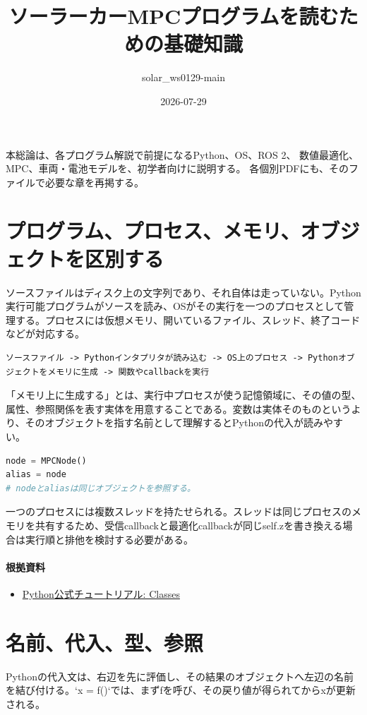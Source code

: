 \documentclass[a4paper,11pt]{article}
\title{ソーラーカーMPCプログラムを読むための基礎知識}
\author{solar\_ws0129-main}
\date{2026-07-29}
\begin{document}
                \maketitle
                \tableofcontents
                \clearpage

                本総論は、各プログラム解説で前提になるPython、OS、ROS 2、
                数値最適化、MPC、車両・電池モデルを、初学者向けに説明する。
                各個別PDFにも、そのファイルで必要な章を再掲する。

                \section{プログラム、プロセス、メモリ、オブジェクトを区別する}
ソースファイルはディスク上の文字列であり、それ自体は走っていない。Python実行可能プログラムがソースを読み、OSがその実行を一つのプロセスとして管理する。プロセスには仮想メモリ、開いているファイル、スレッド、終了コードなどが対応する。


\begin{lstlisting}
ソースファイル -> Pythonインタプリタが読み込む -> OS上のプロセス -> Pythonオブジェクトをメモリに生成 -> 関数やcallbackを実行
\end{lstlisting}


「メモリ上に生成する」とは、実行中プロセスが使う記憶領域に、その値の型、属性、参照関係を表す実体を用意することである。変数は実体そのものというより、そのオブジェクトを指す名前として理解するとPythonの代入が読みやすい。


\begin{lstlisting}[language=python]
node = MPCNode()
alias = node
# nodeとaliasは同じオブジェクトを参照する。
\end{lstlisting}


一つのプロセスには複数スレッドを持たせられる。スレッドは同じプロセスのメモリを共有するため、受信callbackと最適化callbackが同じself.zを書き換える場合は実行順と排他を検討する必要がある。

\paragraph{根拠資料}
\begin{itemize}[leftmargin=1.6em]
\item \href{https://docs.python.org/3/tutorial/classes.html}{Python公式チュートリアル: Classes}
\end{itemize}

\section{名前、代入、型、参照}
Pythonの代入文は、右辺を先に評価し、その結果のオブジェクトへ左辺の名前を結び付ける。`x = f()`では、まずfを呼び、その戻り値が得られてからxが更新される。
\end{document}
